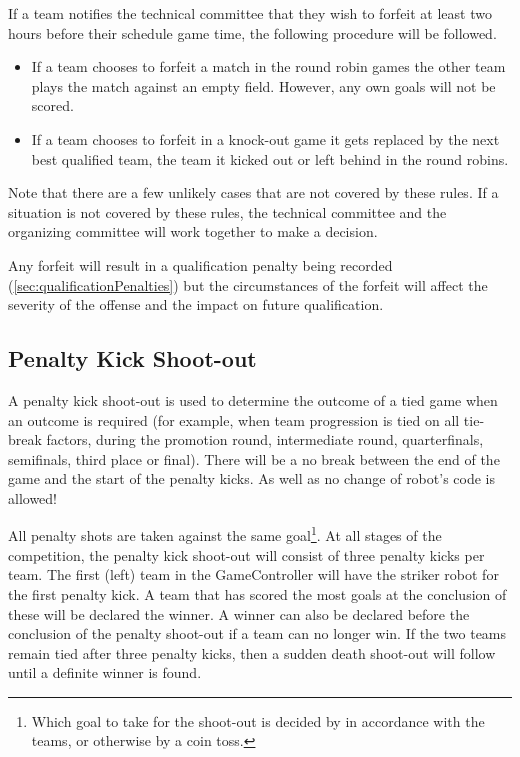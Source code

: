 If a team notifies the technical committee that they wish to forfeit at least two hours before their schedule game time, the following procedure will be followed.

\begin{itemize}
  \item If a team chooses to forfeit a match in the round robin games the other team plays the match against an empty field.  However, any own goals will not be scored.
  \item If a team chooses to forfeit in a knock-out game it gets replaced by the next best qualified team, \ie the team it kicked out or left behind in the round robins.
\end{itemize}

Note that there are a few unlikely cases that are not covered by these rules.  If a situation is not covered by these rules, the technical committee and the organizing committee will work together to make a decision.

Any forfeit will result in a qualification penalty being recorded (\cf \cref{sec:qualificationPenalties}) but the circumstances of the forfeit will affect the severity of the offense and the impact on future qualification.

\subsection{Penalty Kick Shoot-out}
\label{sec:penalty_shoot-out}

A penalty kick shoot-out is used to determine the outcome of a tied game when an outcome is required (for example, when team progression is tied on all tie-break factors, during the promotion round, intermediate round, quarterfinals, semifinals, third place or final).
There will be a no break between the end of the game and the start of the penalty kicks. As well as no change of robot's code is allowed!

All penalty shots are taken against the same goal\footnote{Which goal to take for the shoot-out is decided by in accordance with the teams, or otherwise by a coin toss.}.
At all stages of the competition, the penalty kick shoot-out will consist of three penalty kicks per team.
The first (left) team in the GameController will have the striker robot for the first penalty kick.
A team that has scored the most goals at the conclusion of these will be declared the winner. A winner can also be declared before the conclusion of the penalty shoot-out if a team can no longer win. If the two teams remain tied after three penalty kicks, then a sudden death shoot-out will follow until a definite winner is found.

